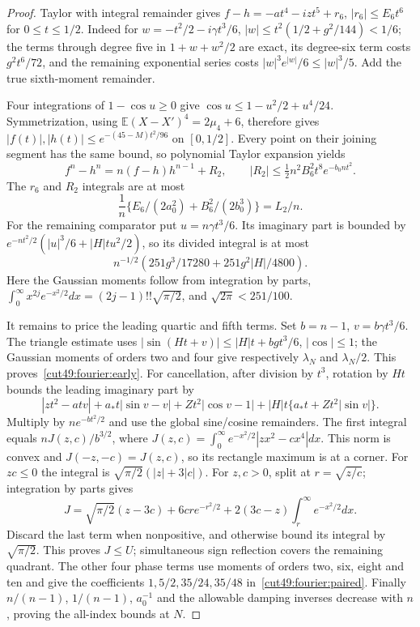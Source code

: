\documentclass[11pt,a4paper]{article}
\numberwithin{equation}{section}
\theoremstyle{definition}
\theoremstyle{remark}
\newcommand{\E}{\mathbb E}
\begin{document}
\begin{proof}
Taylor with integral remainder gives
$f-h=-at^4-izt^5+r_6$, $|r_6|\le E_6t^6$ for $0\le t\le1/2$.
Indeed for $w=-t^2/2-i\gamma t^3/6$,
$|w|\le t^2(1/2+g^2/144)<1/6$; the terms through degree five in
$1+w+w^2/2$ are exact, its degree-six term costs $g^2t^6/72$, and
the remaining exponential series costs $|w|^3e^{|w|}/6\le|w|^3/5$.
Add the true sixth-moment remainder.

Four integrations of $1-\cos u\ge0$ give
$\cos u\le1-u^2/2+u^4/24$. Symmetrization, using
$\E(X-X')^4=2\mu_4+6$, therefore gives
$|f(t)|,|h(t)|\le e^{-(45-M)t^2/96}$ on $[0,1/2]$.
Every point on their joining segment has the same bound, so polynomial
Taylor expansion yields
\[
 f^n-h^n=n(f-h)h^{n-1}+R_2,\qquad
 |R_2|\le\tfrac12n^2B_6^2t^8e^{-b_0nt^2}.
\]
The $r_6$ and $R_2$ integrals are at most
\begin{equation}\label{cut49:fourier:common-error}
 \frac1n\{E_6/(2a_0^2)+B_6^2/(2b_0^3)\}=L_2/n.
\end{equation}
For the remaining comparator put $u=n\gamma t^3/6$. Its imaginary part
is bounded by $e^{-nt^2/2}(|u|^3/6+|H|tu^2/2)$, so its divided integral
is at most
\begin{equation}\label{cut49:fourier:comparator-low}
 n^{-1/2}(251g^3/17280+251g^2|H|/4800).
\end{equation}
Here the Gaussian moments follow from integration by parts,
$\int_0^\infty x^{2j}e^{-x^2/2}dx=(2j-1)!!\sqrt{\pi/2}$,
and $\sqrt{2\pi}<251/100$.

It remains to price the leading quartic and fifth terms. Set $b=n-1$,
$v=b\gamma t^3/6$. The triangle estimate uses
$|\sin(Ht+v)|\le|H|t+bg t^3/6$, $|\cos|\le1$; the Gaussian
moments of orders two and four give respectively $\lambda_N$ and
$\lambda_N/2$. This proves~\eqref{cut49:fourier:early}.
For cancellation, after division by $t^3$, rotation by $Ht$ bounds the
leading imaginary part by
\[
 |zt^2-atv|+a_*t|\sin v-v|+Zt^2|\cos v-1|
       +|H|t\{a_*t+Zt^2|\sin v|\}.
\]
Multiply by $ne^{-bt^2/2}$ and use the global sine/cosine remainders.
The first integral equals $nJ(z,c)/b^{3/2}$, where
$J(z,c)=\int_0^\infty e^{-x^2/2}|zx^2-cx^4|dx$.
This norm is convex and $J(-z,-c)=J(z,c)$, so its rectangle maximum
is at a corner. For $zc\le0$ the integral is
$\sqrt{\pi/2}(|z|+3|c|)$. For $z,c>0$, split at $r=\sqrt{z/c}$;
integration by parts gives
\[
 J=\sqrt{\pi/2}(z-3c)+6cr e^{-r^2/2}
       +2(3c-z)\int_r^\infty e^{-x^2/2}dx.
\]
Discard the last term when nonpositive, and otherwise bound its integral
by $\sqrt{\pi/2}$. This proves $J\le U$; simultaneous sign reflection
covers the remaining quadrant. The other four phase terms use moments
of orders two, six, eight and ten and give the coefficients
$1,5/2,35/24,35/48$ in~\eqref{cut49:fourier:paired}. Finally $n/(n-1)$,
$1/(n-1)$, $a_0^{-1}$ and the allowable damping inverses decrease with
$n$, proving the all-index bounds at $N$.
\end{proof}
\end{document}
